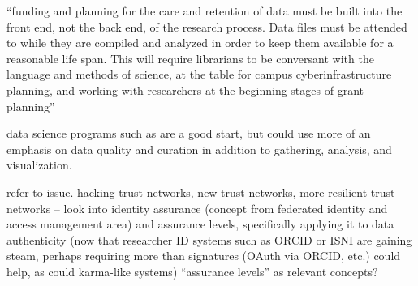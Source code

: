\documentclass{acm_proc_article-sp}
\begin{document}
``funding and planning for the care and retention of data must be
built into the front end, not the back end, of the research
process. Data files must be attended to while they are compiled and
analyzed in order to keep them available for a reasonable life
span. This will require librarians to be conversant with the language
and methods of science, at the table for campus cyberinfrastructure
planning, and working with researchers at the beginning stages of
grant planning'' \cite{ogburn:imperative}

data science programs such as \cite{uw:datascience} are a good start,
but could use more of an emphasis on data quality and curation in
addition to gathering, analysis, and visualization.

refer to \cite{timmer:faking} issue. hacking trust networks, new trust
networks, more resilient trust networks -- look into identity
assurance (concept from federated identity and access management area)
and assurance levels, specifically applying it to data authenticity
(now that researcher ID systems such as ORCID or ISNI are gaining
steam, perhaps requiring more than signatures (OAuth via ORCID, etc.)
could help, as could karma-like systems) ``assurance levels'' as relevant
concepts?

{}



\end{document}
